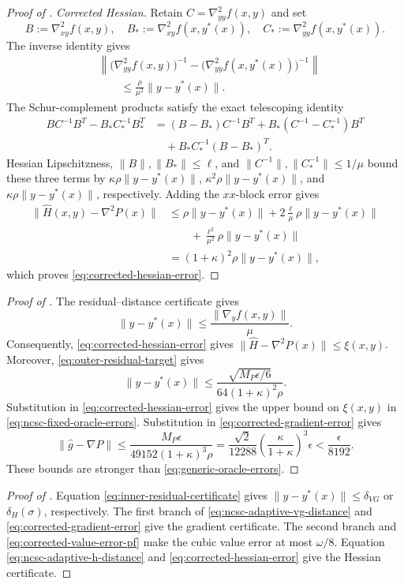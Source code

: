 \documentclass{article}
\begin{document}
\begin{proof}[Proof of ]
\smallskip\noindent\emph{Corrected Hessian.}
Retain $C=\nabla^2_{yy}f(x,y)$ and set
\[
 B:=\nabla^2_{xy}f(x,y),\quad
 B_*:=\nabla^2_{xy}f(x,y^*(x)),\quad
 C_*:=\nabla^2_{yy}f(x,y^*(x)).
\]
The inverse identity gives
\[
\begin{aligned}
&\left\|
 \bigl(\nabla^2_{yy}f(x,y)\bigr)^{-1}
 -\bigl(\nabla^2_{yy}f(x,y^*(x))\bigr)^{-1}
 \right\|\\
&\qquad\le\frac{\rho}{\mu^2}\|y-y^*(x)\|.
\end{aligned}
\]
The Schur-complement products satisfy the exact telescoping identity
\begin{align*}
 BC^{-1}B^T-B_*C_*^{-1}B_*^T
 &=(B-B_*)C^{-1}B^T
   +B_*(C^{-1}-C_*^{-1})B^T\\
 &\quad+B_*C_*^{-1}(B-B_*)^T.
\end{align*}
Hessian Lipschitzness, $\|B\|,\|B_*\|\le\ell$, and
$\|C^{-1}\|,\|C_*^{-1}\|\le1/\mu$ bound these three terms by
$\kappa\rho\|y-y^*(x)\|$,
$\kappa^2\rho\|y-y^*(x)\|$, and
$\kappa\rho\|y-y^*(x)\|$, respectively.  Adding the
$xx$-block error gives
\begin{align*}
 \|\widehat H(x,y)-\nabla^2P(x)\|
 &\le \rho\|y-y^*(x)\|
 +2\frac\ell\mu\rho\|y-y^*(x)\|\\
 &\qquad
 +\frac{\ell^2}{\mu^2}\rho\|y-y^*(x)\|\\
 &=(1+\kappa)^2\rho\|y-y^*(x)\|,
\end{align*}
which proves \eqref{eq:corrected-hessian-error}.
\end{proof}

\begin{proof}[Proof of ]
The residual--distance certificate gives
\[
 \|y-y^*(x)\|\le\frac{\|\nabla_yf(x,y)\|}{\mu}.
\]
Consequently, \eqref{eq:corrected-hessian-error} gives
$\|\widehat H-\nabla^2P(x)\|\le\xi(x,y)$.  Moreover,
\eqref{eq:outer-residual-target} gives
\[
 \|y-y^*(x)\|
 \le\frac{\sqrt{M_P\epsilon/6}}
          {64(1+\kappa)^2\rho}.
\]
Substitution in \eqref{eq:corrected-hessian-error} gives the upper
bound on $\xi(x,y)$ in \eqref{eq:ncsc-fixed-oracle-errors}.
Substitution in
\eqref{eq:corrected-gradient-error} gives
\[
 \|\widehat g-\nabla P\|
 \le\frac{M_P\epsilon}{49152(1+\kappa)^3\rho}
 =\frac{\sqrt2}{12288}
   \left(\frac\kappa{1+\kappa}\right)^3\epsilon
 <\frac\epsilon{8192}.
\]
These bounds are stronger than \eqref{eq:generic-oracle-errors}.
\end{proof}

\begin{proof}[Proof of ]
Equation \eqref{eq:inner-residual-certificate} gives
$\|y-y^*(x)\|\le\delta_{VG}$ or $\delta_H(\sigma)$, respectively.
The first branch of \eqref{eq:ncsc-adaptive-vg-distance} and
\eqref{eq:corrected-gradient-error} give the gradient certificate.
The second branch and \eqref{eq:corrected-value-error-pf} make the
cubic value error at most $\omega/8$.
Equation \eqref{eq:ncsc-adaptive-h-distance} and
\eqref{eq:corrected-hessian-error} give the Hessian certificate.
\end{proof}
\end{document}
